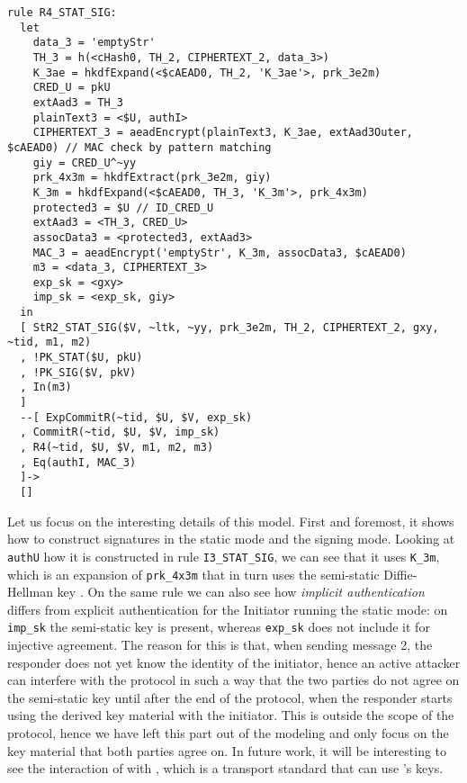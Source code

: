 \begin{lstlisting}
rule R4_STAT_SIG:
  let
    data_3 = 'emptyStr'
    TH_3 = h(<cHash0, TH_2, CIPHERTEXT_2, data_3>)
    K_3ae = hkdfExpand(<$cAEAD0, TH_2, 'K_3ae'>, prk_3e2m)
    CRED_U = pkU
    extAad3 = TH_3
    plainText3 = <$U, authI>
    CIPHERTEXT_3 = aeadEncrypt(plainText3, K_3ae, extAad3Outer, $cAEAD0) // MAC check by pattern matching
    giy = CRED_U^~yy
    prk_4x3m = hkdfExtract(prk_3e2m, giy)
    K_3m = hkdfExpand(<$cAEAD0, TH_3, 'K_3m'>, prk_4x3m)
    protected3 = $U // ID_CRED_U
    extAad3 = <TH_3, CRED_U>
    assocData3 = <protected3, extAad3>
    MAC_3 = aeadEncrypt('emptyStr', K_3m, assocData3, $cAEAD0)
    m3 = <data_3, CIPHERTEXT_3>
    exp_sk = <gxy>
    imp_sk = <exp_sk, giy>
  in
  [ StR2_STAT_SIG($V, ~ltk, ~yy, prk_3e2m, TH_2, CIPHERTEXT_2, gxy, ~tid, m1, m2) 
  , !PK_STAT($U, pkU)
  , !PK_SIG($V, pkV)
  , In(m3)
  ]
  --[ ExpCommitR(~tid, $U, $V, exp_sk)
  , CommitR(~tid, $U, $V, imp_sk)
  , R4(~tid, $U, $V, m1, m2, m3)
  , Eq(authI, MAC_3)
  ]->
  []
\end{lstlisting}

Let us focus on the interesting details of this model. First and
foremost, it shows how to construct signatures in the static mode and
the signing mode.
%
Looking at \lstinline{authU} how it is constructed in rule
\lstinline{I3_STAT_SIG}, we can see that it uses \lstinline{K_3m},
which is an expansion of \lstinline{prk_4x3m} that in turn uses the
semi-static Diffie-Hellman key \mGiy.
%
On the same rule we can also see how \emph{implicit authentication}
differs from explicit authentication for the Initiator running the
static mode: on \lstinline{imp_sk} the semi-static key
\mGiy{} is present, whereas \lstinline{exp_sk} does not include it
for injective agreement.
%
The reason for this is that, when sending message 2, the responder
does not yet know the identity of the initiator, hence an active
attacker can interfere with the protocol in such a way that the two
parties do not agree on the semi-static key
\mGiy{} until after the end of the protocol, when the responder
starts using the derived key material with the initiator.
%
This is outside the scope of the \mEdhoc{} protocol, hence we have left
this part out of the modeling and only focus on the key material that
both parties agree on.
%
In future work, it will be interesting to see the interaction of
\mEdhoc{} with \mOscore, which is a transport standard that can use
\mEdhoc's keys.

